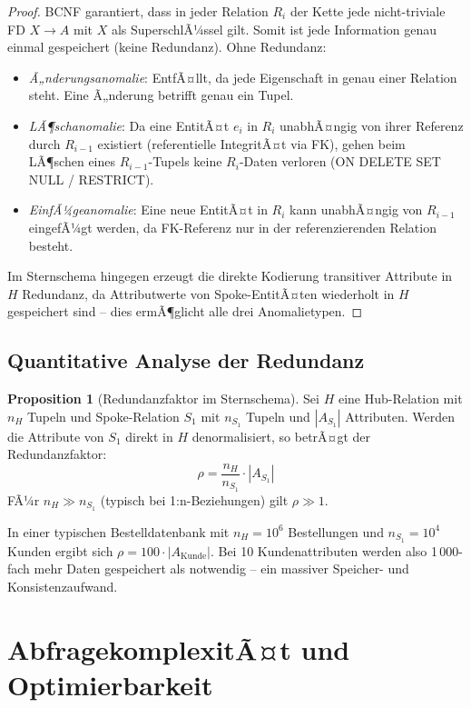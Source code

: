 ﻿\documentclass[12pt,a4paper]{article}
\theoremstyle{definition}
\newtheorem{proposition}[theorem]{Proposition}
\theoremstyle{remark}
\begin{document}
\begin{proof}
BCNF garantiert, dass in jeder Relation $R_i$ der Kette jede nicht-triviale
FD $X \to A$ mit $X$ als SuperschlÃ¼ssel gilt. Somit ist jede Information
genau einmal gespeichert (keine Redundanz). Ohne Redundanz:
\begin{itemize}
  \item \emph{Ã„nderungsanomalie}: EntfÃ¤llt, da jede Eigenschaft in genau einer
        Relation steht. Eine Ã„nderung betrifft genau ein Tupel.
  \item \emph{LÃ¶schanomalie}: Da eine EntitÃ¤t $e_i$ in $R_i$ unabhÃ¤ngig von
        ihrer Referenz durch $R_{i-1}$ existiert (referentielle IntegritÃ¤t
        via FK), gehen beim LÃ¶schen eines $R_{i-1}$-Tupels keine $R_i$-Daten
        verloren (ON DELETE SET NULL / RESTRICT).
  \item \emph{EinfÃ¼geanomalie}: Eine neue EntitÃ¤t in $R_i$ kann unabhÃ¤ngig
        von $R_{i-1}$ eingefÃ¼gt werden, da FK-Referenz nur in der
        referenzierenden Relation besteht.
\end{itemize}
Im Sternschema hingegen erzeugt die direkte Kodierung transitiver Attribute
in $H$ Redundanz, da Attributwerte von Spoke-EntitÃ¤ten wiederholt in $H$
gespeichert sind -- dies ermÃ¶glicht alle drei Anomalietypen.
\end{proof}

\subsection{Quantitative Analyse der Redundanz}

\begin{proposition}[Redundanzfaktor im Sternschema]
\label{prop:redundanz}
Sei $H$ eine Hub-Relation mit $n_H$ Tupeln und Spoke-Relation $S_1$ mit
$n_{S_1}$ Tupeln und $|A_{S_1}|$ Attributen. Werden die Attribute von $S_1$
direkt in $H$ denormalisiert, so betrÃ¤gt der Redundanzfaktor:
\[
  \rho = \frac{n_H}{n_{S_1}} \cdot |A_{S_1}|
\]
FÃ¼r $n_H \gg n_{S_1}$ (typisch bei 1:n-Beziehungen) gilt $\rho \gg 1$.
\end{proposition}

In einer typischen Bestelldatenbank mit $n_H = 10^6$ Bestellungen und
$n_{S_1} = 10^4$ Kunden ergibt sich $\rho = 100 \cdot |A_{\text{Kunde}}|$.
Bei 10 Kundenattributen werden also 1\,000-fach mehr Daten gespeichert
als notwendig -- ein massiver Speicher- und Konsistenzaufwand.

\section{AbfragekomplexitÃ¤t und Optimierbarkeit}
\label{sec:abfragen}
\end{document}

